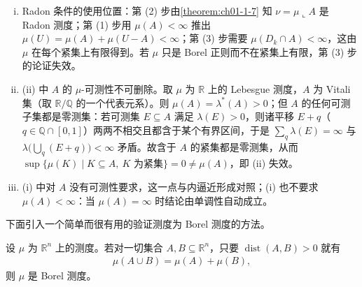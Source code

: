 \documentclass[../../main.tex]{subfiles}
\begin{document}
\begin{remark}\label{remark:ch01-thm-1-8-条件}
\begin{enumerate}[(i)]
\item Radon 条件的使用位置：第 (2) 步由\cref{theorem:ch01-1-7} 知 $\nu=\mu\llcorner A$ 是 Radon 测度；第 (1) 步用 $\mu(A)<\infty$ 推出 $\mu(U)=\mu(A)+\mu(U-A)<\infty$；第 (3) 步需要 $\mu(D_{k}\cap A)<\infty$，这由 $\mu$ 在每个紧集上有限得到。若 $\mu$ 只是 Borel 正则而不在紧集上有限，第 (3) 步的论证失效。%
\item (ii) 中 $A$ 的 $\mu$-可测性不可删除。取 $\mu$ 为 $\mathbb{R}$ 上的 Lebesgue 测度，$A$ 为 Vitali 集（取 $\mathbb{R}/\mathbb{Q}$ 的一个代表元系）。则 $\mu(A)=\lambda^{*}(A)>0$；但 $A$ 的任何可测子集都是零测集：若可测集 $E\subseteq A$ 满足 $\lambda(E)>0$，则诸平移 $E+q$（$q\in\mathbb{Q}\cap[0,1]$）两两不相交且都含于某个有界区间，于是 $\sum_{q}\lambda(E)=\infty$ 与 $\lambda\bigl(\bigcup_{q}(E+q)\bigr)<\infty$ 矛盾。故含于 $A$ 的紧集都是零测集，从而 $\sup\{\mu(K)\mid K\subseteq A,\ K\text{ 为紧集}\}=0\neq\mu(A)$，即 (ii) 失效。
\item (i) 中对 $A$ 没有可测性要求，这一点与内逼近形成对照；(i) 也不要求 $\mu(A)<\infty$：当 $\mu(A)=\infty$ 时结论由单调性自动成立。
\end{enumerate}
\end{remark}

下面引入一个简单而很有用的验证测度为 Borel 测度的方法。

\begin{theorem}[Caratheodory 判据]\label{theorem:ch01-1-9}
设 $\mu$ 为 $\mathbb{R}^{n}$ 上的测度。若对一切集合 $A,B\subseteq\mathbb{R}^{n}$，只要 $\operatorname{dist}(A,B)>0$ 就有
\begin{align*}
\mu(A\cup B)=\mu(A)+\mu(B),
\end{align*}
则 $\mu$ 是 Borel 测度。
\end{theorem}
\end{document}
